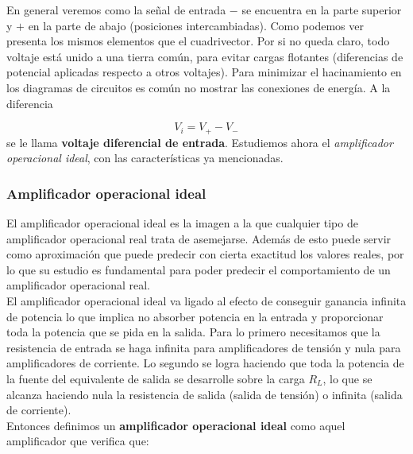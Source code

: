 \documentclass[11pt]{article} %
\begin{document}
En general veremos como la señal de entrada $-$ se encuentra en la parte superior y $+$ en la parte de abajo (posiciones intercambiadas). Como podemos ver presenta los mismos elementos que el cuadrivector. Por si no queda claro, todo voltaje está unido a una tierra común, para evitar cargas flotantes (diferencias de potencial aplicadas respecto a otros voltajes). Para minimizar el hacinamiento en los diagramas de circuitos es común no mostrar las conexiones de energía. A la diferencia

\begin{equation}
V_i = V_+ - V_-
\end{equation}
se le llama \textbf{voltaje diferencial de entrada}. Estudiemos ahora el \textit{amplificador operacional ideal}, con las características ya mencionadas.

\subsubsection{Amplificador operacional ideal}
El amplificador operacional ideal es la imagen a la que cualquier tipo de amplificador operacional real trata de asemejarse. Además de esto puede servir como aproximación que puede predecir con cierta exactitud los valores reales, por lo que su estudio es fundamental para poder predecir el comportamiento de un amplificador operacional real. \\

El amplificador operacional ideal va ligado al efecto de conseguir ganancia infinita de potencia lo que implica no absorber potencia en la entrada y proporcionar toda la potencia que se pida en la salida. Para lo primero necesitamos que la resistencia de entrada se haga infinita para amplificadores de tensión y nula para amplificadores de corriente. Lo segundo se logra haciendo que toda la potencia de la fuente del equivalente de salida se desarrolle sobre la carga $R_L$, lo que se alcanza haciendo nula la resistencia de salida (salida de tensión) o infinita (salida de corriente). \\

Entonces definimos un \textbf{amplificador operacional ideal} como aquel amplificador que verifica que:
\end{document}
